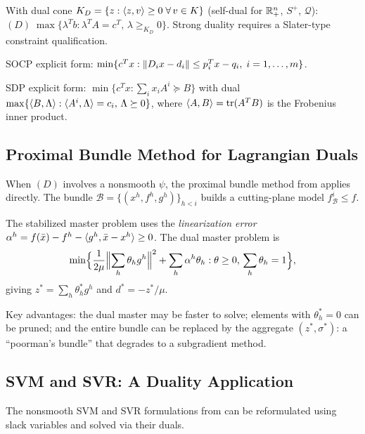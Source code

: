 \begin{definition}\label{def:conic-dual}
	With dual cone $K_D = \{z : \langle z, v\rangle \geq 0\;\forall\, v \in K\}$ (self-dual for $\mathbb{R}_+^n$, $S^+$, $\mathcal{Q}$):
	$(D)\; \max\{\lambda^T b : \lambda^T A = c^T,\, \lambda \geq_{K_D} 0\}$.
	Strong duality requires a Slater-type constraint qualification.
\end{definition}

SOCP explicit form: $\min\{c^T x : \lVert D_i x - d_i\rVert \leq p_i^T x - q_i,\; i = 1, \dots, m\}$.

SDP explicit form: $\min\{c^T x : \sum_i x_i A^i \succeq B\}$ with dual $\max\{\langle B, \Lambda\rangle : \langle A^i, \Lambda\rangle = c_i,\, \Lambda \succeq 0\}$, where $\langle A, B\rangle = \operatorname{tr}(A^T B)$ is the Frobenius inner product.


\subsection{Proximal Bundle Method for Lagrangian Duals}\label{sec:bundle-dual}

When $(D)$ involves a nonsmooth $\psi$, the proximal bundle method from  applies directly.
The bundle $\mathcal{B} = \{(x^h, f^h, g^h)\}_{h < i}$ builds a cutting-plane model $f_{\mathcal{B}}^i \leq f$.

The stabilized master problem uses the \emph{linearization error} $\alpha^h = f(\bar{x}) - f^h - \langle g^h, \bar{x} - x^h\rangle \geq 0$.
The dual master problem is
\begin{equation}\label{eq:dual-master}
	\min\Bigl\{\frac{1}{2\mu}\Bigl\|\sum_{h} \theta_h g^h\Bigr\|^2 + \sum_h \alpha^h \theta_h : \theta \geq 0,\, \sum_h \theta_h = 1\Bigr\},
\end{equation}
giving $z^* = \sum_h \theta_h^* g^h$ and $d^* = -z^*/\mu$.

Key advantages: the dual master may be faster to solve; elements with $\theta_h^* = 0$ can be pruned; and the entire bundle can be replaced by the aggregate $(z^*, \sigma^*)$: a ``poorman's bundle'' that degrades to a subgradient method.


\subsection{SVM and SVR: A Duality Application}\label{sec:svm-duality}

The nonsmooth SVM and SVR formulations from  can be reformulated using slack variables and solved via their duals.

